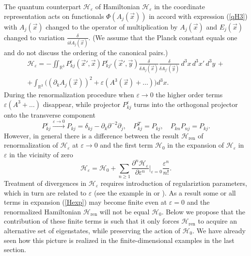 \documentclass[12pt]{article}
\newcommand{\pl}{\partial}
\newcommand{\HH}{\mathscr{H}}
\newcommand{\Hcl}{\mathcal{H}}
\newcommand{\RR}{\mathbb{R}}
\newcommand{\ve}{\varepsilon}
\begin{document}
    The quantum counterpart
$ \HH_{\ve} $ of Hamiltonian
$ \Hcl_{\ve} $
    in the coordinate representation
    acts on functionals
$ \Phi(A_{j}(\vec{x})) $
    in accord with expression
(\ref{qH3})
    with
$ A_{j}(\vec{x}) $
    changed to the operator of multiplication by
$ A_{j}(\vec{x}) $
    and
$ E_{j}(\vec{x}) $
    changed to variation
$ \frac{\delta}{i\delta A_{j}(\vec{x})} $.
    (We assume that the Planck constant equals one and do not discuss
    the ordering of the canonical pairs.)
\begin{multline*}
    \HH_{\ve}
    = - \iint_{\RR^{3}}	P_{kj}^{\ve}(\vec{x}',\vec{x})
	P_{kj'}^{\ve}(\vec{x}',\vec{y})
    \frac{\delta}{\delta A_{j}(\vec{x})} \frac{\delta}{\delta A_{j'}(\vec{y})}
	    \, d^{3}x \, d^{3}x' \, d^{3}y \,+\\
	+ \int_{\RR^{3}}\bigl((\pl_{k} A_{j}(\vec{x}))^{2}
	+ \ve (A^{3}(\vec{x})+\ldots) \bigr) d^{3}x .
\end{multline*}
	During the renormalization procedure when
$ \ve \to 0 $
	the higher order terms
$ \ve (A^{3}+\ldots) $
	disappear, while projector
$ P_{kj}^{\ve} $
	turns into the orthogonal projector onto the transverse component
\begin{equation}
\label{Plim}
    P_{kj}^{\ve} \stackrel{\ve\to 0}{\rightarrow}
	P_{kj} = \delta_{kj} - \pl_{k} \pl^{-2} \pl_{j} ,\quad
    P_{kj}^{T} = P_{kj} ,\quad P_{kn} P_{nj} = P_{kj} .
\end{equation}
	However, in general there is a difference between the result
$ \HH_{\text{ren}} $
    of renormalization of
$ \HH_{\ve} $ at
$ \ve\to 0 $
    and the first term
$ \HH_{0} $ in the expansion of
$ \HH_{\ve} $
    in
$ \ve $
    in the vicinity of zero
\begin{equation}
\label{Hexp}
    \HH_{\ve} = \HH_{0} + \sum_{n\geq 1}
	\frac{\partial^{n} \HH_{\ve}}{\partial\ve^{n}}\bigr|_{\ve =0}
	\frac{\ve^{n}}{n!} .
\end{equation}
    Treatment of divergences in
$ \HH_{\ve} $
    requires introduction of regulariztion parameters,
    which in turn are related to
$ \ve $ (see the example in
\cite{LFBrazil} or \cite{LFres}).
    As a result some or all terms in expansion
(\ref{Hexp})
    may become finite even at
$ \ve = 0 $
    and the renormalized Hamiltonian
$ \HH_{\text{ren}} $
    will not be equal
$ \HH_{0} $.
    Below we propose that the contribution of these finite terms is such that
    it only forces
$ \HH_{\text{ren}} $
    to acquire an alternative set of eigenstates, while preserving the
    action of
$ \HH_{0} $.
    We have already seen how this picture is realized in the finite-dimensional
    examples in the last section.
\end{document}
